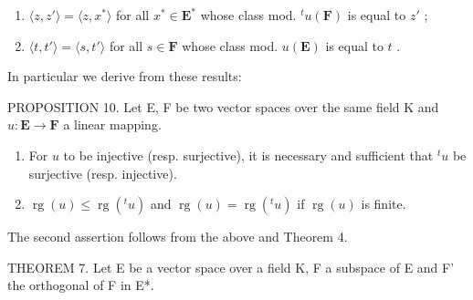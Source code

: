 \begin{enumerate}
\def\labelenumi{(\arabic{enumi})}
\setcounter{enumi}{16}
\item
  \(\langle z, z' \rangle = \langle z, x^* \rangle\) for all \(x^* \in \mathbf{E}^*\) whose class mod. \(^t u(\mathbf{F})\) is equal to \(z'\) ;
\item
  \(\langle t, t' \rangle = \langle s, t' \rangle\) for all \(s \in \mathbf{F}\) whose class mod. \(u(\mathbf{E})\) is equal to \(t\) .
\end{enumerate}

In particular we derive from these results:

PROPOSITION 10. Let E, F be two vector spaces over the same field K and \(u: \mathbf{E} \to \mathbf{F}\) a linear mapping.

\begin{enumerate}
\def\labelenumi{(\roman{enumi})}
\item
  For \(u\) to be injective (resp. surjective), it is necessary and sufficient that \(^{t}u\) be surjective (resp. injective).
\item
  \(\operatorname{rg}(u) \leqslant \operatorname{rg}(^t u)\) and \(\operatorname{rg}(u) = \operatorname{rg}(^t u)\) if \(\operatorname{rg}(u)\) is finite.
\end{enumerate}

The second assertion follows from the above and Theorem 4.

THEOREM 7. Let E be a vector space over a field K, F a subspace of E and F' the orthogonal of F in E*.

